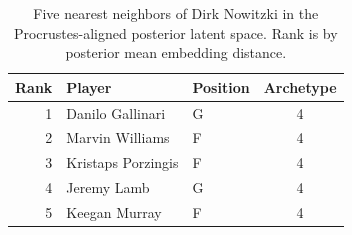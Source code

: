 \begin{table}[htbp]
  \centering\small
  \begin{tabular}{rllc}
    \toprule
    Rank & Player & Position & Archetype \\
    \midrule
    1 & Danilo Gallinari & G & 4 \\
    2 & Marvin Williams & F & 4 \\
    3 & Kristaps Porzingis & F & 4 \\
    4 & Jeremy Lamb & G & 4 \\
    5 & Keegan Murray & F & 4 \\
    \bottomrule
  \end{tabular}
  \caption{Five nearest neighbors of Dirk Nowitzki in the Procrustes-aligned posterior latent space. Rank is by posterior mean embedding distance.}
  \label{tab:Dirk_Nowitzki_neighbors}
\end{table}

